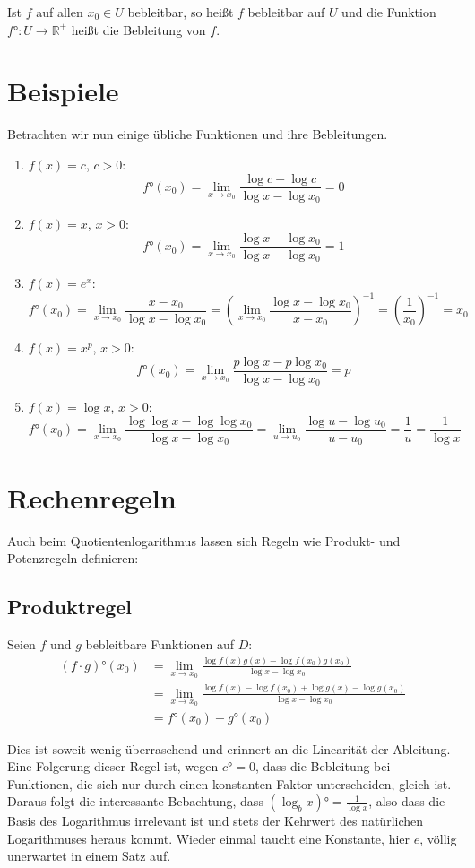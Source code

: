 \documentclass{amsart}
\begin{document}
Ist $f$ auf allen $x_0 \in U$ bebleitbar, so heißt $f$ bebleitbar auf $U$ und die Funktion $f°:U\to\mathbb R^+$ heißt die Bebleitung von $f$.


\section{Beispiele}

Betrachten wir nun einige übliche Funktionen und ihre Bebleitungen.

\begin{enumerate}
\item $f(x) = c$, $c>0$:
\[f°(x_0) = \lim_{x\to x_0} \frac{\log c - \log c}{\log x - \log x_0} = 0 \]
\item $f(x) = x$, $x>0$:
\[f°(x_0) = \lim_{x\to x_0} \frac{\log x - \log x_0}{\log x - \log x_0} = 1 \]
\item $f(x) = e^x$:
\[f°(x_0) = \lim_{x\to x_0} \frac{x - x_0}{\log x - \log x_0} = \left(\lim_{x\to x_0} \frac{\log x - \log x_0}{x-x_0}\right)^{-1} = (\frac1{x_0})^{-1} = x_0 \]
\item $f(x) = x^p$, $x>0$:
\[f°(x_0) = \lim_{x\to x_0} \frac{p\log x - p\log x_0}{\log x - \log x_0} = p \]
\item $f(x) = \log x$, $x>0$:
\[f°(x_0) = \lim_{x\to x_0} \frac{\log\log x - \log\log x_0}{\log x - \log x_0} = \lim_{u\to u_0}\frac{\log u - \log u_0}{u-u_0} = \frac{1}{u} = \frac{1}{\log x} \]
\end{enumerate}

\section{Rechenregeln}

Auch beim Quotientenlogarithmus lassen sich Regeln wie Produkt- und Potenzregeln definieren:

\subsection{Produktregel}
Seien $f$ und $g$ bebleitbare Funktionen auf $D$:
\begin{align*}
(f\cdot g)°(x_0) &= \lim_{x\to x_0} \frac{\log f(x)g(x) - \log f(x_0)g(x_0)}{\log x - \log x_0}\\
&= \lim_{x\to x_0}\frac{\log f(x) - \log f(x_0) + \log g(x) - \log g(x_0)}{\log x - \log x_0}\\
&= f°(x_0) + g°(x_0)
\end{align*}

Dies ist soweit wenig überraschend und erinnert an die Linearität der Ableitung. Eine Folgerung dieser Regel ist, wegen $c°=0$, dass die Bebleitung bei Funktionen, die sich nur durch einen konstanten Faktor unterscheiden, gleich ist. Daraus folgt die interessante Bebachtung, dass $(\log_b x)°=\frac{1}{\log x}$, also dass die Basis des Logarithmus irrelevant ist und stets der Kehrwert des natürlichen Logarithmuses heraus kommt. Wieder einmal taucht eine Konstante, hier $e$, völlig unerwartet in einem Satz auf.
\end{document}
